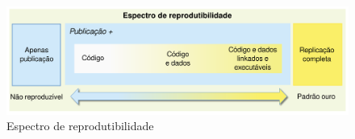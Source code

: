 \begin{figure}[h]
  \center
  \includegraphics[scale=0.35]{imagens/reproducibility-spectrum-ptbr.png}
  \caption{Espectro de reprodutibilidade \cite{peng2011reproducible}}
  \label{reproducibility-spectrum}
\end{figure}

%





